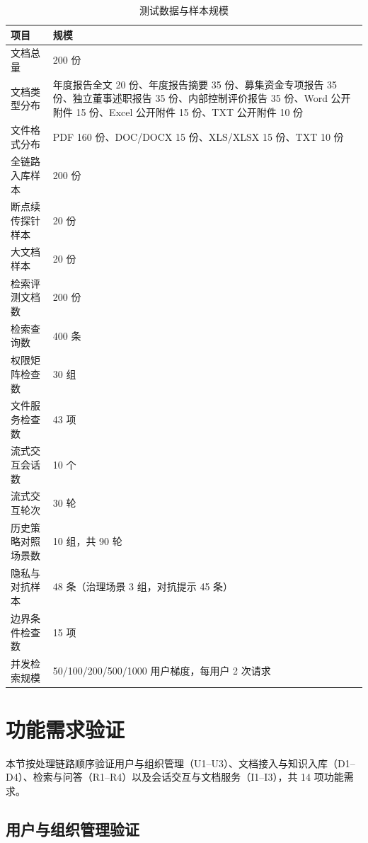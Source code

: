 \begin{table}[H]
    \centering
    \caption{测试数据与样本规模}
    \label{tab:system-test-data-scale}
    {\small
    \begin{tabularx}{\textwidth}{L{3.6cm}Y}
        \toprule
        项目 & 规模 \\
        \midrule
        文档总量 & 200 份 \\
        文档类型分布 & 年度报告全文 20 份、年度报告摘要 35 份、募集资金专项报告 35 份、独立董事述职报告 35 份、内部控制评价报告 35 份、Word 公开附件 15 份、Excel 公开附件 15 份、TXT 公开附件 10 份 \\
        文件格式分布 & PDF 160 份、DOC/DOCX 15 份、XLS/XLSX 15 份、TXT 10 份 \\
        全链路入库样本 & 200 份 \\
        断点续传探针样本 & 20 份 \\
        大文档样本 & 20 份 \\
        检索评测文档数 & 200 份 \\
        检索查询数 & 400 条 \\
        权限矩阵检查数 & 30 组 \\
        文件服务检查数 & 43 项 \\
        流式交互会话数 & 10 个 \\
        流式交互轮次 & 30 轮 \\
        历史策略对照场景数 & 10 组，共 90 轮 \\
        隐私与对抗样本 & 48 条（治理场景 3 组，对抗提示 45 条） \\
        边界条件检查数 & 15 项 \\
        并发检索规模 & 50/100/200/500/1000 用户梯度，每用户 2 次请求 \\
        \bottomrule
    \end{tabularx}
    }
\end{table}

\section{功能需求验证}

本节按处理链路顺序验证用户与组织管理（U1--U3）、文档接入与知识入库（D1--D4）、检索与问答（R1--R4）以及会话交互与文档服务（I1--I3），共 14 项功能需求。

\subsection{用户与组织管理验证}

